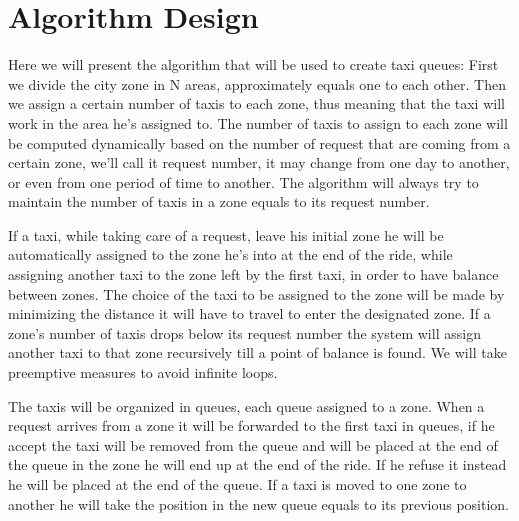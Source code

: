 \section{Algorithm Design}

Here we will present the algorithm that will be used to create taxi queues:
\newline
\newline
First we divide the city zone in N areas, approximately equals one to each other. Then we assign a certain number of taxis to each zone, thus meaning that the taxi will work in the area he's assigned to. The number of taxis to assign to each zone will be computed dynamically based on the number of request that are coming from a certain zone, we'll call it request number, it may change from one day to another, or even from one period of time to another. The algorithm will always try to maintain the number of taxis in a zone equals to its request number. 

If a taxi, while taking care of a request, leave his initial zone he will be automatically assigned to the zone he's into at the end of the ride, while assigning another taxi to the zone left by the first taxi, in order to have balance between zones. The choice of the taxi to be assigned to the zone will be made by minimizing the distance it will have to travel to enter the designated zone. If a zone's number of taxis drops below its request number the system will assign another taxi to that zone recursively till a point of balance is found. We will take preemptive measures to avoid infinite loops.

The taxis will be organized in queues, each queue assigned to a zone. When a request arrives from a zone it will be forwarded to the first taxi in queues, if he accept the taxi will be removed from the queue and will be placed at the end of the queue in the zone he will end up at the end of the ride. If he refuse it instead he will be placed at the end of the queue. If a taxi is moved to one zone to another he will take the position in the new queue equals to its previous position.